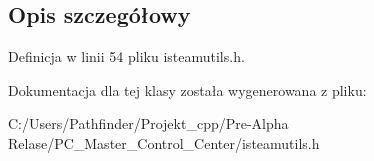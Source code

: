\subsection{Opis szczegółowy}


Definicja w linii 54 pliku isteamutils.\+h.



Dokumentacja dla tej klasy została wygenerowana z pliku\+:\begin{DoxyCompactItemize}
\item 
C\+:/\+Users/\+Pathfinder/\+Projekt\+\_\+cpp/\+Pre-\/\+Alpha Relase/\+P\+C\+\_\+\+Master\+\_\+\+Control\+\_\+\+Center/isteamutils.\+h\end{DoxyCompactItemize}

